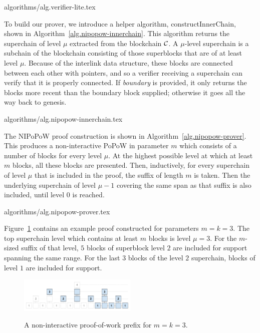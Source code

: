 {algorithms/alg.verifier-lite.tex}

To build our prover, we introduce a helper algorithm, constructInnerChain,
shown in Algorithm~\ref{alg.nipopow-innerchain}. This algorithm returns the
superchain of level $\mu$ extracted from the blockchain $\mathcal{C}$. A
$\mu$-level superchain is a subchain of the blockchain consisting of those
superblocks that are of at least level $\mu$. Because of the interlink data
structure, these blocks are connected between each other with pointers, and so
a verifier receiving a superchain can verify that it is properly connected.
If \textit{boundary} is provided, it only returns the blocks more recent than
the boundary block supplied; otherwise it goes all the way back to genesis.

{algorithms/alg.nipopow-innerchain.tex}

The NIPoPoW proof construction is shown in Algorithm~\ref{alg.nipopow-prover}.
This produces a non-interactive PoPoW in parameter $m$ which consists of a
number of blocks for every level $\mu$. At the highest possible level at which
at least $m$ blocks, all these blocks are presented. Then, inductively, for
every superchain of level $\mu$ that is included in the proof, the suffix of
length $m$ is taken. Then the underlying superchain of level $\mu - 1$ covering
the same span as that suffix is also included, until level $0$ is reached.

{algorithms/alg.nipopow-prover.tex}


Figure~\ref{fig.nipopow} contains an example proof constructed for parameters
$m = k = 3$. The top superchain level which contains at least $m$ blocks is
level $\mu = 3$. For the $m$-sized suffix of that level, $5$ blocks of
superblock level $2$ are included for support spanning the same range. For the
last $3$ blocks of the level $2$ superchain, blocks of level $1$ are included
for support.

\begin{figure}[h]
    \caption{A non-interactive proof-of-work prefix for $m = k = 3$.}
    \centering
    \includegraphics[width=0.5\textwidth,keepaspectratio]{figures/non-interactive-popow.png}
    \label{fig.nipopow}
\end{figure}


